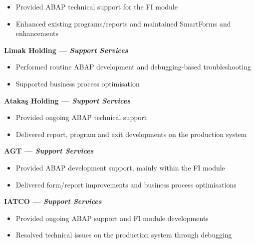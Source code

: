 \documentclass[10pt,a4paper]{extarticle}
\begin{document}
\begin{itemize}[leftmargin=*,noitemsep,topsep=0pt]
    \item Provided ABAP technical support for the FI module
    \item Enhanced existing programs/reports and maintained SmartForms and enhancements
\end{itemize}
\textbf{Limak Holding \textnormal{--- \textit{Support Services}}}
\begin{itemize}[leftmargin=*,noitemsep,topsep=0pt]
    \item Performed routine ABAP development and debugging-based troubleshooting
    \item Supported business process optimisation
\end{itemize}
\textbf{Atakaş Holding \textnormal{--- \textit{Support Services}}}
\begin{itemize}[leftmargin=*,noitemsep,topsep=0pt]
    \item Provided ongoing ABAP technical support
    \item Delivered report, program and exit developments on the production system
\end{itemize}
\textbf{AGT \textnormal{--- \textit{Support Services}}}
\begin{itemize}[leftmargin=*,noitemsep,topsep=0pt]
    \item Provided ABAP development support, mainly within the FI module
    \item Delivered form/report improvements and business process optimisations
\end{itemize}
\textbf{IATCO \textnormal{--- \textit{Support Services}}}
\begin{itemize}[leftmargin=*,noitemsep,topsep=0pt]
    \item Provided ongoing ABAP support and FI module developments
    \item Resolved technical issues on the production system through debugging
\end{itemize}
\end{document}
